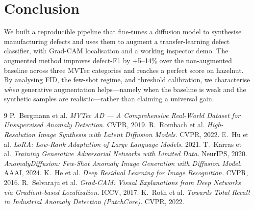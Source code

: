 \documentclass[11pt]{article}
\begin{document}
\section{Conclusion}
We built a reproducible pipeline that fine-tunes a diffusion model to synthesise
manufacturing defects and uses them to augment a transfer-learning defect
classifier, with Grad-CAM localisation and a working inspector demo. The
augmented method improves defect-F1 by +5--14\% over the non-augmented baseline
across three MVTec categories and reaches a perfect score on hazelnut. By
analysing FID, the few-shot regime, and threshold calibration, we characterise
\emph{when} generative augmentation helps---namely when the baseline is weak and
the synthetic samples are realistic---rather than claiming a universal gain.

\begin{thebibliography}{9}
 P.~Bergmann et al. \emph{MVTec AD --- A Comprehensive
Real-World Dataset for Unsupervised Anomaly Detection.} CVPR, 2019.
 R.~Rombach et al. \emph{High-Resolution Image Synthesis
with Latent Diffusion Models.} CVPR, 2022.
 E.~Hu et al. \emph{LoRA: Low-Rank Adaptation of Large
Language Models.} 2021.
 T.~Karras et al. \emph{Training Generative
Adversarial Networks with Limited Data.} NeurIPS, 2020.
 \emph{AnomalyDiffusion: Few-Shot Anomaly Image
Generation with Diffusion Model.} AAAI, 2024.
 K.~He et al. \emph{Deep Residual Learning for Image
Recognition.} CVPR, 2016.
 R.~Selvaraju et al. \emph{Grad-CAM: Visual
Explanations from Deep Networks via Gradient-based Localization.} ICCV, 2017.
 K.~Roth et al. \emph{Towards Total Recall in
Industrial Anomaly Detection (PatchCore).} CVPR, 2022.
\end{thebibliography}
\end{document}
